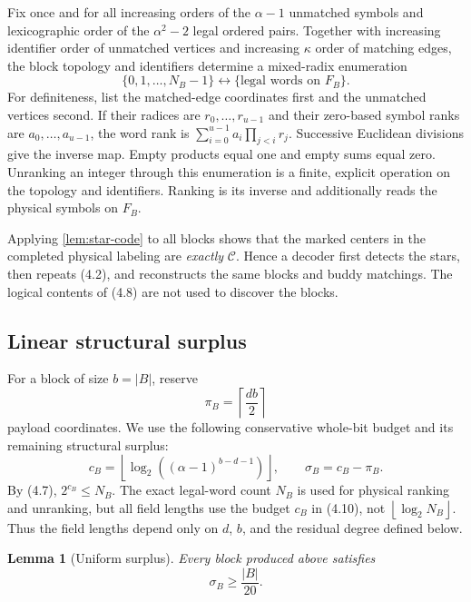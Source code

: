 \documentclass[11pt]{article}
\newtheorem{lemma}[theorem]{Lemma}
\theoremstyle{definition}
\theoremstyle{remark}
\newcommand{\ceil}[1]{\left\lceil #1\right\rceil}
\newcommand{\floor}[1]{\left\lfloor #1\right\rfloor}
\begin{document}
Fix once and for all increasing orders of the $\alpha-1$ unmatched symbols
and lexicographic order of the $\alpha^2-2$ legal ordered pairs.  Together with increasing
identifier order of unmatched vertices and increasing $\kappa$ order of
matching edges, the block topology and identifiers determine a mixed-radix
enumeration
\[
              \{0,1,\ldots,N_B-1\}
                 \longleftrightarrow
              \{\text{legal words on }F_B\}.                  \tag{4.8}
\]
For definiteness, list the matched-edge coordinates first and the unmatched
vertices second.  If their radices are $r_0,\ldots,r_{u-1}$ and their
zero-based symbol ranks are $a_0,\ldots,a_{u-1}$, the word rank is
$\sum_{i=0}^{u-1}a_i\prod_{j<i}r_j$.  Successive Euclidean divisions give
the inverse map.  Empty products equal one and empty sums equal zero.
Unranking an integer through this enumeration is a finite, explicit operation
on the topology and identifiers.  Ranking is its inverse and additionally
reads the physical symbols on $F_B$.

Applying \cref{lem:star-code} to all blocks shows that the marked centers in
the completed physical labeling are \emph{exactly} $\mathcal C$.  Hence a
decoder first detects the stars, then repeats (4.2), and reconstructs the
same blocks and buddy matchings.  The logical contents of (4.8) are not used
to discover the blocks.

\subsection{Linear structural surplus}

For a block of size $b=|B|$, reserve
\[
                    \pi_B=\ceil{\frac{db}{2}}                 \tag{4.9}
\]
payload coordinates.  We use the following conservative whole-bit budget
and its remaining structural surplus:
\[
                    c_B=\floor{\log_2((\alpha-1)^{b-d-1})},\qquad
                    \sigma_B=c_B-\pi_B.                       \tag{4.10}
\]
By (4.7), $2^{c_B}\le N_B$.  The exact legal-word count $N_B$ is used for
physical ranking and unranking, but all field lengths use the budget
$c_B$ in (4.10), not $\floor{\log_2N_B}$.  Thus the field lengths depend
only on $d$, $b$, and the residual degree defined below.

\begin{lemma}[Uniform surplus]
\label{lem:surplus}
Every block produced above satisfies
\[
                              \sigma_B\ge\frac{|B|}{20}.        \tag{4.11}
\]
\end{lemma}
\end{document}
